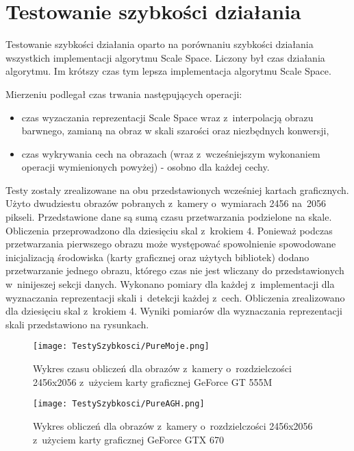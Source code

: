 \section{Testowanie szybkości działania}
\label{sec:testSzybkosci}

Testowanie szybkości działania oparto na porównaniu szybkości działania wszystkich implementacji algorytmu Scale Space. Liczony był czas działania algorytmu. Im krótszy czas tym lepsza implementacja algorytmu Scale Space.

Mierzeniu podlegał czas trwania następujących operacji:
\begin{itemize}
\item czas wyzaczania reprezentacji Scale Space wraz z~interpolacją obrazu barwnego, zamianą na obraz w skali szarości oraz niezbędnych konwersji,
\item czas wykrywania cech na obrazach (wraz z~wcześniejszym wykonaniem operacji wymienionych powyżej) - osobno dla każdej cechy.
\end{itemize}

Testy zostały zrealizowane na obu przedstawionych wcześniej kartach graficznych. Użyto dwudziestu obrazów pobranych z~kamery o~wymiarach 2456 na~2056 pikseli. Przedstawione dane są sumą czasu przetwarzania podzielone na skale. Obliczenia przeprowadzono dla dziesięciu skal z~krokiem 4. Ponieważ podczas przetwarzania pierwszego obrazu może występować spowolnienie spowodowane inicjalizacją środowiska (karty graficznej oraz użytych bibliotek) dodano przetwarzanie jednego obrazu, którego czas nie jest wliczany do przedstawionych w~ninijeszej sekcji danych. Wykonano pomiary dla każdej z~implementacji dla wyznaczania reprezentacji skali i~detekcji każdej z~cech. Obliczenia zrealizowano dla dziesięciu skal z~krokiem 4. Wyniki pomiarów dla wyznaczania reprezentacji skali przedstawiono na rysunkach.

\begin{figure}[h]
\begin{center}
\texttt{[image: TestySzybkosci/PureMoje.png]}
\end{center}
\caption{Wykres czasu obliczeń dla obrazów z~kamery o~rozdzielczości 2456x2056 z~użyciem karty graficznej GeForce GT 555M}
\label{fig:pureSzybkoscMoje}
\end{figure}

\begin{figure}[h]
\begin{center}
\texttt{[image: TestySzybkosci/PureAGH.png]}
\end{center}
\caption{Wykres obliczeń dla obrazów z~kamery o~rozdzielczości 2456x2056 z~użyciem karty graficznej GeForce GTX 670}
\label{fig:pureSzybkoscAGH}
\end{figure}

